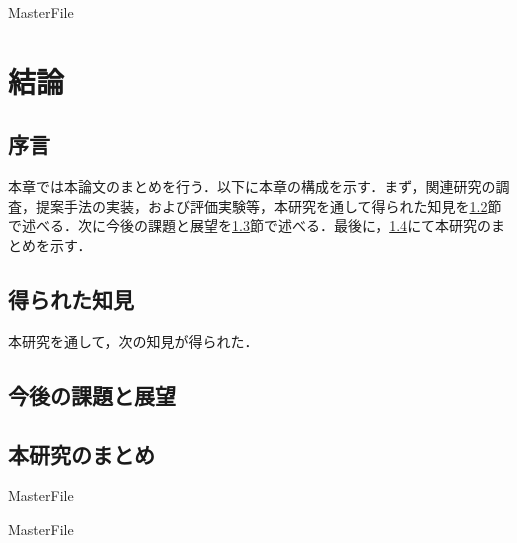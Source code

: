 \expandafter\ifx\csname MasterFile\endcsname\relax
\def\SubFile{hoge}


\setcounter{chapter}{5}
\fi
\cleardoublepage
\chapter{結論}
\label{con:chapter}

\section{序言}
\label{con:introduction}
本章では本論文のまとめを行う．以下に本章の構成を示す．まず，関連研究の調査，提案手法の実装，および評価実験等，本研究を通して得られた知見を\ref{con:knowledge}節で述べる．次に今後の課題と展望を\ref{con:future_work}節で述べる．最後に，\ref{con:conclusion}にて本研究のまとめを示す．

\section{得られた知見}
\label{con:knowledge}
本研究を通して，次の知見が得られた．

\section{今後の課題と展望}
\label{con:future_work}


\section{本研究のまとめ}
\label{con:conclusion}

 \expandafter\ifx\csname MasterFile\endcsname\relax
	\def\BibFile{hoge}
	
  \fi
  \expandafter\ifx\csname MasterFile\endcsname\relax

\fi
